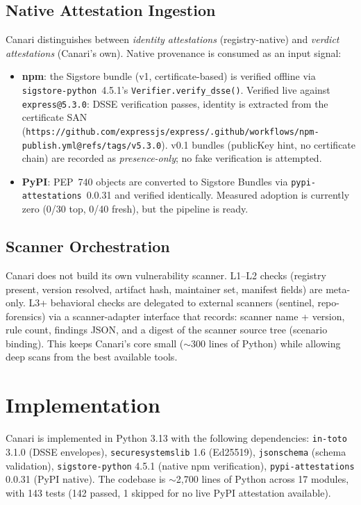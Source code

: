 \documentclass[11pt,a4paper]{article}
\begin{document}
\subsection{Native Attestation Ingestion}

Canari distinguishes between \emph{identity attestations} (registry-native) and
\emph{verdict attestations} (Canari's own). Native provenance is consumed as an
input signal:

\begin{itemize}[leftmargin=1.5em]
\item \textbf{npm}: the Sigstore bundle (v1, certificate-based) is verified
offline via \texttt{sigstore-python}~4.5.1's \texttt{Verifier.verify\_dsse()}.
Verified live against \texttt{express@5.3.0}: DSSE verification passes,
identity is extracted from the certificate SAN
(\texttt{https://github.com/expressjs/express/.github/workflows/npm-publish.yml@refs/tags/v5.3.0}).
v0.1 bundles (publicKey hint, no certificate chain) are recorded as
\emph{presence-only}; no fake verification is attempted.
\item \textbf{PyPI}: PEP~740 objects are converted to Sigstore Bundles via
\texttt{pypi-attestations}~0.0.31 and verified identically. Measured adoption
is currently zero (0/30 top, 0/40 fresh), but the pipeline is ready.
\end{itemize}

\subsection{Scanner Orchestration}

Canari does not build its own vulnerability scanner. L1--L2 checks (registry
present, version resolved, artifact hash, maintainer set, manifest fields) are
meta-only. L3+ behavioral checks are delegated to external scanners (sentinel,
repo-forensics) via a scanner-adapter interface that records:
scanner name + version, rule count, findings JSON, and a digest of the scanner
source tree (scenario binding). This keeps Canari's core small ($\sim$300 lines
of Python) while allowing deep scans from the best available tools.

\section{Implementation}

Canari is implemented in Python 3.13 with the following dependencies:
\texttt{in-toto} 3.1.0 (DSSE envelopes), \texttt{securesystemslib} 1.6
(Ed25519), \texttt{jsonschema} (schema validation), \texttt{sigstore-python} 4.5.1
(native npm verification), \texttt{pypi-attestations} 0.0.31 (PyPI native).
The codebase is $\sim$2{,}700 lines of Python across 17 modules, with 143 tests
(142 passed, 1 skipped for no live PyPI attestation available).
\end{document}
